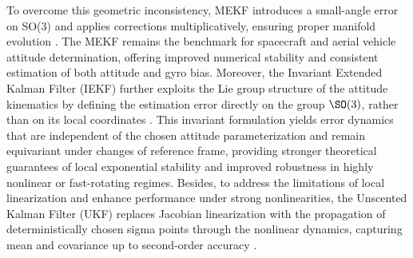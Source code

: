 To overcome this geometric inconsistency, MEKF introduces a small-angle error on SO(3) and applies corrections multiplicatively, ensuring proper manifold evolution \cite{lefferts1982kalman}. The MEKF remains the benchmark for spacecraft and aerial vehicle attitude determination, offering improved numerical stability and consistent estimation of both attitude and gyro bias.
Moreover, the Invariant Extended Kalman Filter (IEKF) further exploits the Lie group structure of the attitude kinematics by defining the estimation error directly on the group 
$\SO(3)$, rather than on its local coordinates \cite{barrau2017invariant,barrau2018invariant}. This invariant formulation yields error dynamics that are independent of the chosen attitude parameterization and remain equivariant under changes of reference frame, providing stronger theoretical guarantees of local exponential stability and improved robustness in highly nonlinear or fast-rotating regimes. Besides, to address the limitations of local linearization and enhance performance under strong nonlinearities, the Unscented Kalman Filter (UKF) replaces Jacobian linearization with the propagation of deterministically chosen sigma points through the nonlinear dynamics, capturing mean and covariance up to second-order accuracy \cite{Unscented_Julier_Uhlmann_1997_Aerosense,Unscented_Julier_Uhlmann_DurrantWhyte_ICRA_2000,Unscented_Crassidis_Markley_JGCD_2003,Unscented_Julier_Uhlmann_ProcIEEE_2004}.


